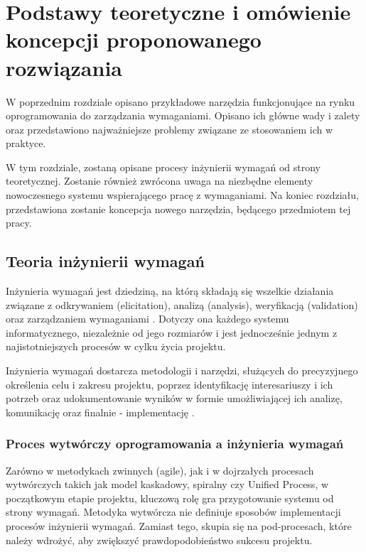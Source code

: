 \chapter{Podstawy teoretyczne i omówienie koncepcji proponowanego rozwiązania}
  
  W poprzednim rozdziale opisano przykładowe narzędzia funkcjonujące na rynku oprogramowania do zarządzania wymaganiami. Opisano ich główne wady i zalety oraz przedstawiono najważniejsze problemy związane ze stosowaniem ich w praktyce.

  W tym rozdziale, zostaną opisane procesy inżynierii wymagań od strony teoretycznej. Zostanie również zwrócona uwaga na niezbędne elementy nowoczesnego systemu wspierającego pracę z wymaganiami. Na koniec rozdziału, przedstawiona zostanie koncepcja nowego narzędzia, będącego przedmiotem tej pracy.
  
  \section{Teoria inżynierii wymagań}
    
    Inżynieria wymagań jest dziedziną, na którą składają się wszelkie działania związane z odkrywaniem (elicitation), analizą (analysis), weryfikacją (validation) oraz zarządzaniem wymaganiami \cite{Somm06}. Dotyczy ona każdego systemu informatycznego, niezależnie od jego rozmiarów i jest jednocześnie jednym z najistotniejszych procesów w cylku życia projektu.

    Inżynieria wymagań dostarcza metodologii i narzędzi, służących do precyzyjnego określenia celu i zakresu projektu, poprzez identyfikację interesariuszy i ich potrzeb oraz udokumentowanie wyników w formie umożliwiającej ich analizę, komunikację oraz finalnie - implementację \cite{Nus00}. 

    \subsection{Proces wytwórczy oprogramowania a inżynieria wymagań}

      Zarówno w metodykach zwinnych (agile), jak i w dojrzałych procesach wytwórczych takich jak model kaskadowy, spiralny czy Unified Process, w początkowym etapie projektu, kluczową rolę gra przygotowanie systemu od strony wymagań. Metodyka wytwórcza nie definiuje sposobów implementacji procesów inżynierii wymagań. Zamiast tego, skupia się na pod-procesach, które należy wdrożyć, aby zwiększyć prawdopodobieństwo sukcesu projektu.

